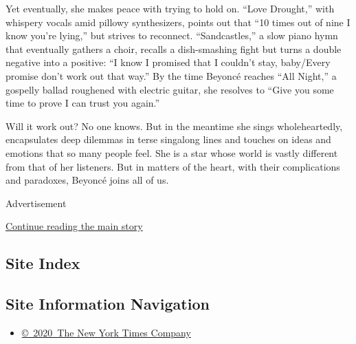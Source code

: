 Yet eventually, she makes peace with trying to hold on. ``Love
Drought,'' with whispery vocals amid pillowy synthesizers, points out
that ``10 times out of nine I know you're lying,'' but strives to
reconnect. ``Sandcastles,'' a slow piano hymn that eventually gathers a
choir, recalls a dish-smashing fight but turns a double negative into a
positive: ``I know I promised that I couldn't stay, baby/Every promise
don't work out that way.'' By the time Beyoncé reaches ``All Night,'' a
gospelly ballad roughened with electric guitar, she resolves to ``Give
you some time to prove I can trust you again.''

Will it work out? No one knows. But in the meantime she sings
wholeheartedly, encapsulates deep dilemmas in terse singalong lines and
touches on ideas and emotions that so many people feel. She is a star
whose world is vastly different from that of her listeners. But in
matters of the heart, with their complications and paradoxes, Beyoncé
joins all of us.

Advertisement

\protect\hyperlink{after-bottom}{Continue reading the main story}

\hypertarget{site-index}{%
\subsection{Site Index}\label{site-index}}

\hypertarget{site-information-navigation}{%
\subsection{Site Information
Navigation}\label{site-information-navigation}}

\begin{itemize}
\tightlist
\item
  \href{https://help.nytimes.com/hc/en-us/articles/115014792127-Copyright-notice}{©~2020~The
  New York Times Company}
\end{itemize}

